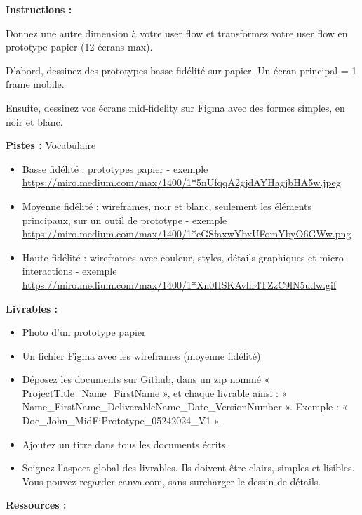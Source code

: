 \makeheaderfiles

\textbf{Instructions :}

Donnez une autre dimension à votre user flow et transformez votre user flow en prototype papier (12 écrans max).

D'abord, dessinez des prototypes basse fidélité sur papier. Un écran principal = 1 frame mobile.

Ensuite, dessinez vos écrans mid-fidelity sur Figma avec des formes simples, en noir et blanc.

\textbf{Pistes :} Vocabulaire

\begin{itemize}
\item Basse fidélité : prototypes papier - exemple \url{https://miro.medium.com/max/1400/1*5nUfqqA2gjdAYHagjbHA5w.jpeg}
\item Moyenne fidélité : wireframes, noir et blanc, seulement les éléments principaux, sur un outil de prototype - exemple \url{https://miro.medium.com/max/1400/1*eGSfaxwYbxUFomYbyO6GWw.png}
\item Haute fidélité : wireframes avec couleur, styles, détails graphiques et micro-interactions - exemple \url{https://miro.medium.com/max/1400/1*Xn0HSKAvhr4TZzC9lN5udw.gif}
\end{itemize}

\textbf{Livrables :}

\begin{itemize}
\item Photo d'un prototype papier
\item Un fichier Figma avec les wireframes (moyenne fidélité)
\item Déposez les documents sur Github, dans un zip nommé « ProjectTitle\_Name\_FirstName », et chaque livrable ainsi : « Name\_FirstName\_DeliverableName\_Date\_VersionNumber ». Exemple : « Doe\_John\_MidFiPrototype\_05242024\_V1 ».
\item Ajoutez un titre dans tous les documents écrits.
\item Soignez l'aspect global des livrables. Ils doivent être clairs, simples et lisibles. Vous pouvez regarder canva.com, sans surcharger le dessin de détails.
\end{itemize}

\textbf{Ressources :}

